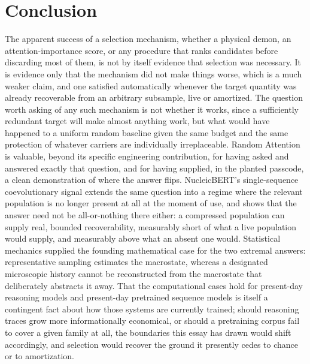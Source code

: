 \documentclass[11pt]{article}
\begin{document}
\section{Conclusion}

The apparent success of a selection mechanism, whether a physical demon, an attention-importance score, or any procedure that ranks candidates before discarding most of them, is not by itself evidence that selection was necessary. It is evidence only that the mechanism did not make things worse, which is a much weaker claim, and one satisfied automatically whenever the target quantity was already recoverable from an arbitrary subsample, live or amortized. The question worth asking of any such mechanism is not whether it works, since a sufficiently redundant target will make almost anything work, but what would have happened to a uniform random baseline given the same budget and the same protection of whatever carriers are individually irreplaceable. Random Attention is valuable, beyond its specific engineering contribution, for having asked and answered exactly that question, and for having supplied, in the planted passcode, a clean demonstration of where the answer flips. NucleicBERT's single-sequence coevolutionary signal extends the same question into a regime where the relevant population is no longer present at all at the moment of use, and shows that the answer need not be all-or-nothing there either: a compressed population can supply real, bounded recoverability, measurably short of what a live population would supply, and measurably above what an absent one would. Statistical mechanics supplied the founding mathematical case for the two extremal answers: representative sampling estimates the macrostate, whereas a designated microscopic history cannot be reconstructed from the macrostate that deliberately abstracts it away. That the computational cases hold for present-day reasoning models and present-day pretrained sequence models is itself a contingent fact about how those systems are currently trained; should reasoning traces grow more informationally economical, or should a pretraining corpus fail to cover a given family at all, the boundaries this essay has drawn would shift accordingly, and selection would recover the ground it presently cedes to chance or to amortization.
\end{document}

